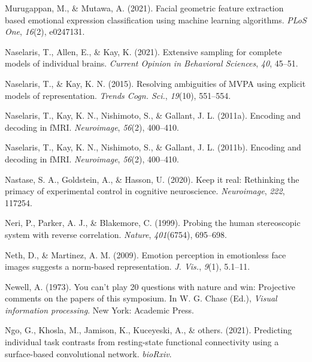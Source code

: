 \documentclass[11pt,american,a4paper,oneside,]{memoir} %
\begin{document}
\leavevmode\hypertarget{ref-Murugappan2021-yj}{}%
Murugappan, M., \& Mutawa, A. (2021). Facial geometric feature extraction based emotional expression classification using machine learning algorithms. \emph{PLoS One}, \emph{16}(2), e0247131.

\leavevmode\hypertarget{ref-Naselaris2021-ba}{}%
Naselaris, T., Allen, E., \& Kay, K. (2021). Extensive sampling for complete models of individual brains. \emph{Current Opinion in Behavioral Sciences}, \emph{40}, 45--51.

\leavevmode\hypertarget{ref-Naselaris2015-jn}{}%
Naselaris, T., \& Kay, K. N. (2015). Resolving ambiguities of MVPA using explicit models of representation. \emph{Trends Cogn. Sci.}, \emph{19}(10), 551--554.

\leavevmode\hypertarget{ref-naselaris2011encoding}{}%
Naselaris, T., Kay, K. N., Nishimoto, S., \& Gallant, J. L. (2011a). Encoding and decoding in fMRI. \emph{Neuroimage}, \emph{56}(2), 400--410.

\leavevmode\hypertarget{ref-Naselaris2011-oh}{}%
Naselaris, T., Kay, K. N., Nishimoto, S., \& Gallant, J. L. (2011b). Encoding and decoding in fMRI. \emph{Neuroimage}, \emph{56}(2), 400--410.

\leavevmode\hypertarget{ref-Nastase2020-he}{}%
Nastase, S. A., Goldstein, A., \& Hasson, U. (2020). Keep it real: Rethinking the primacy of experimental control in cognitive neuroscience. \emph{Neuroimage}, \emph{222}, 117254.

\leavevmode\hypertarget{ref-Neri1999-rj}{}%
Neri, P., Parker, A. J., \& Blakemore, C. (1999). Probing the human stereoscopic system with reverse correlation. \emph{Nature}, \emph{401}(6754), 695--698.

\leavevmode\hypertarget{ref-Neth2009-eh}{}%
Neth, D., \& Martinez, A. M. (2009). Emotion perception in emotionless face images suggests a norm-based representation. \emph{J. Vis.}, \emph{9}(1), 5.1--11.

\leavevmode\hypertarget{ref-Newell1973-no}{}%
Newell, A. (1973). You can't play 20 questions with nature and win: Projective comments on the papers of this symposium. In W. G. Chase (Ed.), \emph{Visual information processing}. New York: Academic Press.

\leavevmode\hypertarget{ref-Ngo2021-kf}{}%
Ngo, G., Khosla, M., Jamison, K., Kuceyeski, A., \& others. (2021). Predicting individual task contrasts from resting-state functional connectivity using a surface-based convolutional network. \emph{bioRxiv}.
\end{document}
